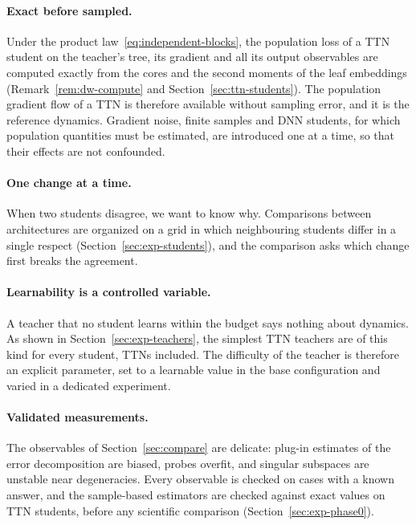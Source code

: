 \documentclass[11pt]{article}
\theoremstyle{definition}
\numberwithin{equation}{section}
\begin{document}
\paragraph{Exact before sampled.}
Under the product law~\eqref{eq:independent-blocks}, the population loss of a TTN student on the teacher's tree, its gradient and all its output observables are computed exactly from the cores and the second moments of the leaf embeddings (Remark~\ref{rem:dw-compute} and Section~\ref{sec:ttn-students}). The population gradient flow of a TTN is therefore available without sampling error, and it is the reference dynamics. Gradient noise, finite samples and DNN students, for which population quantities must be estimated, are introduced one at a time, so that their effects are not confounded.

\paragraph{One change at a time.}
When two students disagree, we want to know why. Comparisons between architectures are organized on a grid in which neighbouring students differ in a single respect (Section~\ref{sec:exp-students}), and the comparison asks which change first breaks the agreement.

\paragraph{Learnability is a controlled variable.}
A teacher that no student learns within the budget says nothing about dynamics. As shown in Section~\ref{sec:exp-teachers}, the simplest TTN teachers are of this kind for every student, TTNs included. The difficulty of the teacher is therefore an explicit parameter, set to a learnable value in the base configuration and varied in a dedicated experiment.

\paragraph{Validated measurements.}
The observables of Section~\ref{sec:compare} are delicate: plug-in estimates of the error decomposition are biased, probes overfit, and singular subspaces are unstable near degeneracies. Every observable is checked on cases with a known answer, and the sample-based estimators are checked against exact values on TTN students, before any scientific comparison (Section~\ref{sec:exp-phase0}).
\end{document}
